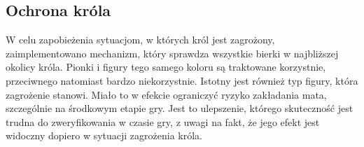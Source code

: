 \subsection{Ochrona króla}
\label{subsec:ochrona-krola}

W celu zapobieżenia sytuacjom, w których król jest zagrożony, zaimplementowano mechanizm, który sprawdza wszystkie bierki w najbliższej okolicy króla.
Pionki i figury tego samego koloru są traktowane korzystnie, przeciwnego natomiast bardzo niekorzystnie.
Istotny jest również typ figury, która zagrożenie stanowi.
Miało to w efekcie ograniczyć ryzyko zakładania mata, szczególnie na środkowym etapie gry.
Jest to ulepszenie, którego skuteczność jest trudna do zweryfikowania w czasie gry, z uwagi na fakt, że jego efekt jest widoczny dopiero w sytuacji zagrożenia króla.

